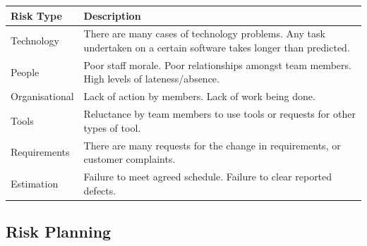 \documentclass[11pt]{article}
\begin{document}
\begin{center}
\begin{tabular}{|l|p{}|}
\hline
\textbf{Risk Type} & \textbf{Description} \\ \hline
Technology & There are many cases of technology problems. Any task undertaken on a certain software takes longer than predicted. \\ \hline
People & Poor staff morale. Poor relationships amongst team members. High levels of lateness/absence. \\ \hline
Organisational & Lack of action by members. Lack of work being done. \\ \hline
Tools & Reluctance by team members to use tools or requests for other types of tool. \\ \hline
Requirements & There are many requests for the change in requirements, or customer complaints. \\ \hline
Estimation & Failure to meet agreed schedule. Failure to clear reported defects. \\ \hline
\end{tabular}
\end{center}

\subsection{Risk Planning}
\end{document}
